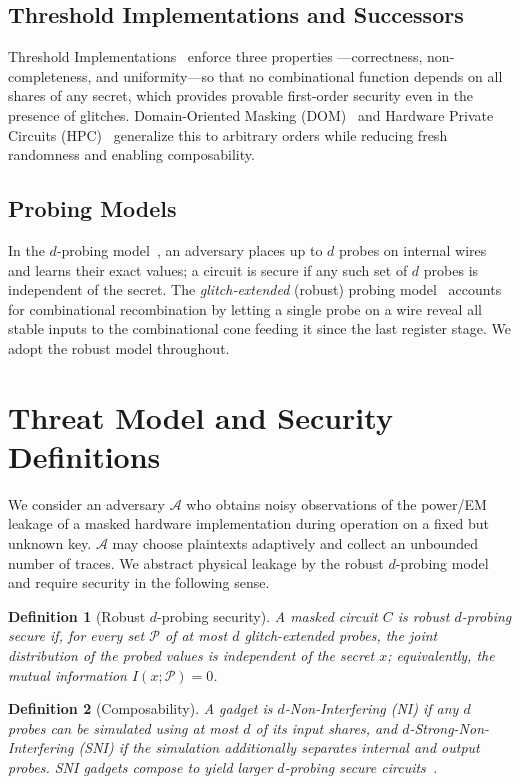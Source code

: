 \documentclass[lettersize,journal]{IEEEtran}
\newtheorem{definition}{Definition}
\newcommand{\Adv}{\mathcal{A}}
\begin{document}
\subsection{Threshold Implementations and Successors}
Threshold Implementations~\cite{nikova2006threshold} enforce three properties
---correctness, non-completeness, and uniformity---so that no combinational
function depends on all shares of any secret, which provides provable
first-order security even in the presence of glitches. Domain-Oriented Masking
(DOM)~\cite{gross2016dom} and Hardware Private Circuits
(HPC)~\cite{cassiers2020hpc} generalize this to arbitrary orders while reducing
fresh randomness and enabling composability.

\subsection{Probing Models}
In the $d$-probing model~\cite{ishai2003private}, an adversary places up to $d$
probes on internal wires and learns their exact values; a circuit is secure if
any such set of $d$ probes is independent of the secret. The
\emph{glitch-extended} (robust) probing model~\cite{faust2018composable}
accounts for combinational recombination by letting a single probe on a wire
reveal all stable inputs to the combinational cone feeding it since the last
register stage. We adopt the robust model throughout.

\section{Threat Model and Security Definitions}
\label{sec:model}
We consider an adversary $\Adv$ who obtains noisy observations of the power/EM
leakage of a masked hardware implementation during operation on a fixed but
unknown key. $\Adv$ may choose plaintexts adaptively and collect an
unbounded number of traces. We abstract physical leakage by the robust
$d$-probing model and require security in the following sense.

\begin{definition}[Robust $d$-probing security]
\label{def:probing}
A masked circuit $C$ is \emph{robust $d$-probing secure} if, for every set
$\mathcal{P}$ of at most $d$ glitch-extended probes, the joint distribution of
the probed values is independent of the secret $x$; equivalently, the mutual
information $I(x;\mathcal{P}) = 0$.
\end{definition}

\begin{definition}[Composability]
\label{def:comp}
A gadget is $d$-Non-Interfering (NI) if any $d$ probes can be simulated using at
most $d$ of its input shares, and $d$-Strong-Non-Interfering (SNI) if the
simulation additionally separates internal and output probes. SNI gadgets
compose to yield larger $d$-probing secure circuits~\cite{barthe2016strong}.
\end{definition}
\end{document}
